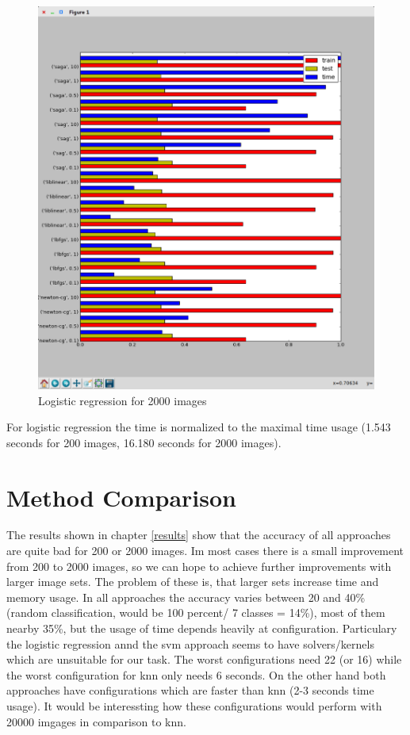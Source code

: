 \begin{figure}[!htb]
	\includegraphics[width=\textwidth]{images/logistic2000}
	\caption{Logistic regression for 2000 images}
\end{figure}

For logistic regression the time is normalized to the maximal time usage (1.543 seconds for 200 images, 16.180 seconds for 2000 images).


\chapter{Method Comparison}

The results shown in chapter \ref{results} show that the accuracy of all approaches are quite bad for 200 or 2000 images. Im most cases there is a small improvement from 200 to 2000 images, so we can hope to achieve further improvements with larger image sets. The problem of these is, that larger sets increase time and memory usage. In all approaches the accuracy varies between 20 and 40\% (random classification, would be 100 percent/ 7 classes = 14\%), most of them nearby 35\%, but the usage of time depends heavily at configuration. Particulary the logistic regression annd the svm approach seems to have solvers/kernels which are unsuitable for our task. The worst configurations need 22 (or 16) while the worst configuration for knn only needs 6 seconds. On the other hand both approaches have configurations which are faster than knn (2-3 seconds time usage). It would be interessting how these configurations would perform with 20000 imgages in comparison to knn.

